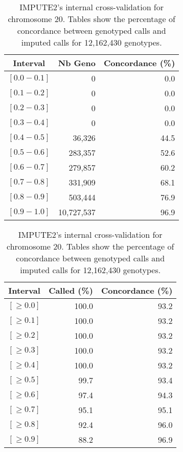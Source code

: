 \documentclass[10pt,twoside,english]{scrartcl}
\begin{document}
\begin{table}[H]
\protect\caption{IMPUTE2's internal cross-validation for chromosome 20. Tables show the
percentage of concordance between genotyped calls and imputed calls
for 12,162,430 genotypes.\label{tab:cross_validation_chr_20}}

\centering

\begin{tabular}{crr}
\hline 
\multicolumn{1}{c}{\textbf{Interval}}
 & \multicolumn{1}{c}{\textbf{Nb Geno}}
 & \multicolumn{1}{c}{\textbf{Concordance (\%)}}
\\
\hline 

$[0.0-0.1]$ & 0 & 0.0\\
$[0.1-0.2]$ & 0 & 0.0\\
$[0.2-0.3]$ & 0 & 0.0\\
$[0.3-0.4]$ & 0 & 0.0\\
$[0.4-0.5]$ & 36,326 & 44.5\\
$[0.5-0.6]$ & 283,357 & 52.6\\
$[0.6-0.7]$ & 279,857 & 60.2\\
$[0.7-0.8]$ & 331,909 & 68.1\\
$[0.8-0.9]$ & 503,444 & 76.9\\
$[0.9-1.0]$ & 10,727,537 & 96.9\\
\hline 
\end{tabular}
\hfill
\begin{tabular}{crr}
\hline 
\multicolumn{1}{c}{\textbf{Interval}}
 & \multicolumn{1}{c}{\textbf{Called (\%)}}
 & \multicolumn{1}{c}{\textbf{Concordance (\%)}}
\\
\hline 

$[\geq 0.0]$ & 100.0 & 93.2\\
$[\geq 0.1]$ & 100.0 & 93.2\\
$[\geq 0.2]$ & 100.0 & 93.2\\
$[\geq 0.3]$ & 100.0 & 93.2\\
$[\geq 0.4]$ & 100.0 & 93.2\\
$[\geq 0.5]$ & 99.7 & 93.4\\
$[\geq 0.6]$ & 97.4 & 94.3\\
$[\geq 0.7]$ & 95.1 & 95.1\\
$[\geq 0.8]$ & 92.4 & 96.0\\
$[\geq 0.9]$ & 88.2 & 96.9\\
\hline 
\end{tabular}


\end{table}
\end{document}
